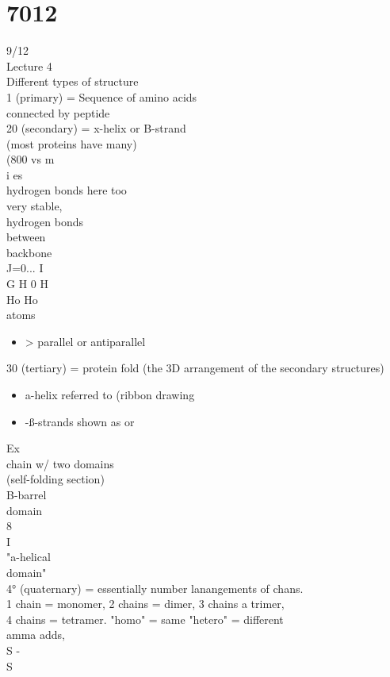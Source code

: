 \documentclass{article}
\begin{document}
 \section{7012}9/12\\
Lecture 4\\
Different types of structure\\
1 (primary) = Sequence of amino acids\\
connected by peptide\\
20 (secondary) = x-helix or B-strand\\
(most proteins have many)\\
(800 vs m\\
i es\\
hydrogen bonds here too\\
very stable,\\
hydrogen bonds\\
between\\
backbone\\
J=0... I\\
G H 0 H\\
Ho Ho\\
atoms\\
\begin{itemize}
\item > parallel or antiparallel
\end{itemize}
30 (tertiary) = protein fold (the 3D arrangement of the secondary structures)
\begin{itemize}
\item  a-helix referred to (ribbon drawing
\item -ß-strands shown as or
\end{itemize}
Ex\\
chain w/ two domains\\
(self-folding section)\\
B-barrel\\
domain\\
8\\
I\\
"a-helical\\
domain"\\
4° (quaternary) = essentially number lanangements of chans.\\
1 chain = monomer, 2 chains = dimer, 3 chains a trimer,\\
4 chains = tetramer. "homo" = same "hetero" = different\\
amma adds,\\
S -\\
S\\
\end{document}
